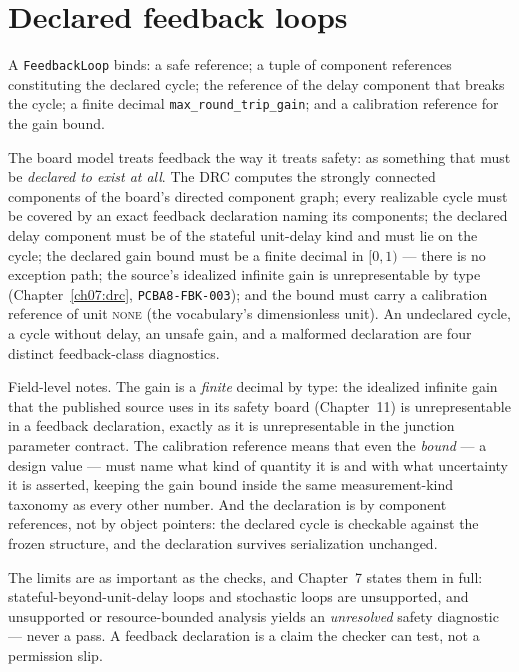 \section{Declared feedback loops}\label{ch05:sec:feedback}

\begin{definition}\label{ch05:def:feedback}
A \texttt{FeedbackLoop} binds: a safe reference; a tuple of component
references constituting the declared cycle; the reference of the delay
component that breaks the cycle; a finite decimal
\texttt{max\_round\_trip\_gain}; and a calibration reference for the
gain bound.
\end{definition}

The board model treats feedback the way it treats safety: as something
that must be \emph{declared to exist at all}. The DRC computes the
strongly connected components of the board's directed component graph;
every realizable cycle must be covered by an exact feedback declaration
naming its components; the declared delay component must be of the
stateful unit-delay kind and must lie on the cycle; the declared gain
bound must be a finite decimal in $[0,1)$ --- there is no exception
path; the source's idealized infinite gain is unrepresentable by type
(Chapter~\ref{ch07:drc}, \texttt{PCBA8-FBK-003}); and the bound must
carry a calibration reference of unit \textsc{none} (the vocabulary's
dimensionless unit). An undeclared cycle, a
cycle without delay, an unsafe gain, and a malformed declaration are four
distinct feedback-class diagnostics.

Field-level notes. The gain is a \emph{finite} decimal by type: the
idealized infinite gain that the published source uses in its safety
board (Chapter~11) is unrepresentable in a feedback declaration, exactly
as it is unrepresentable in the junction parameter contract. The
calibration reference means that even the \emph{bound} --- a design
value --- must name what kind of quantity it is and with what
uncertainty it is asserted, keeping the gain bound inside the same
measurement-kind taxonomy as every other number. And the declaration is
by component references, not by object pointers: the declared cycle is
checkable against the frozen structure, and the declaration survives
serialization unchanged.

The limits are as important as the checks, and Chapter~7 states them in
full: stateful-beyond-unit-delay loops and stochastic loops are
unsupported, and unsupported or resource-bounded analysis yields an
\emph{unresolved} safety diagnostic --- never a pass. A feedback
declaration is a claim the checker can test, not a permission slip.

